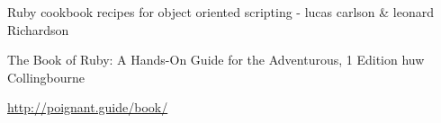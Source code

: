 \documentclass[a4paper]{article}
\begin{document}
\begin{thebibliography}{9}
Ruby cookbook recipes for object oriented scripting - lucas carlson \& leonard Richardson
 
The Book of Ruby: A Hands-On Guide for the Adventurous, 1 Edition huw Collingbourne
 
\url{http://poignant.guide/book/}
\end{thebibliography}
\end{document}
